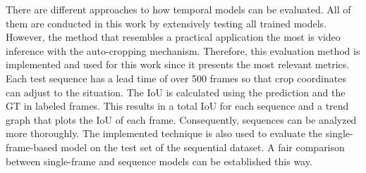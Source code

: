 There are different approaches to how temporal models can be evaluated.
All of them are conducted in this work by extensively testing all trained models.
However, the method that resembles a practical application the most is video inference with the auto-cropping mechanism.
Therefore, this evaluation method is implemented and used for this work since it presents the most relevant metrics.
Each test sequence has a lead time of over 500 frames so that crop coordinates can adjust to the situation.
The \ac{IoU} is calculated using the prediction and the \ac{GT} in labeled frames.
This results in a total \ac{IoU} for each sequence and a trend graph that plots the \ac{IoU} of each frame.
Consequently, sequences can be analyzed more thoroughly.
The implemented technique is also used to evaluate the single-frame-based model on the test set of the sequential dataset.
A fair comparison between single-frame and sequence models can be established this way.